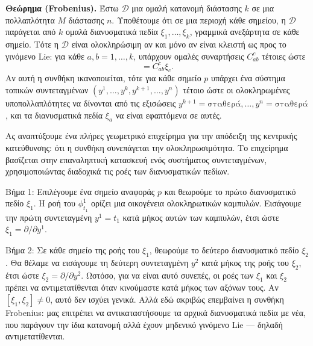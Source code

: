 \documentclass[12pt]{article}
\begin{document}
\textbf{Θεώρημα (Frobenius).} Έστω $\mathcal{D}$ μια ομαλή κατανομή διάστασης $k$ σε μια πολλαπλότητα $M$ διάστασης $n$. Υποθέτουμε ότι σε μια περιοχή κάθε σημείου, η $\mathcal{D}$ παράγεται από $k$ ομαλά διανυσματικά πεδία $\xi_1, \dots, \xi_k$, γραμμικά ανεξάρτητα σε κάθε σημείο. Τότε η $\mathcal{D}$ είναι ολοκληρώσιμη αν και μόνο αν είναι κλειστή ως προς το γινόμενο Lie: για κάθε $a, b = 1, \dots, k$, υπάρχουν ομαλές συναρτήσεις $C_{ab}^c$ τέτοιες ώστε
\begin{equation}
[\xi_a, \xi_b] = C_{ab}^c \xi_c.
\end{equation}
Αν αυτή η συνθήκη ικανοποιείται, τότε για κάθε σημείο $p$ υπάρχει ένα σύστημα τοπικών συντεταγμένων $(y^1, \dots, y^k, y^{k+1}, \dots, y^n)$ τέτοιο ώστε οι ολοκληρωμένες υποπολλαπλότητες να δίνονται από τις εξισώσεις $y^{k+1} = \text{σταθερά}, \dots, y^n = \text{σταθερά}$, και τα διανυσματικά πεδία $\xi_a$ να είναι εφαπτόμενα σε αυτές.

Ας αναπτύξουμε ένα πλήρες γεωμετρικό επιχείρημα για την απόδειξη της κεντρικής κατεύθυνσης: ότι η συνθήκη συνεπάγεται την ολοκληρωσιμότητα. Το επιχείρημα βασίζεται στην επαναληπτική κατασκευή ενός συστήματος συντεταγμένων, χρησιμοποιώντας διαδοχικά τις ροές των διανυσματικών πεδίων.

Βήμα 1: Επιλέγουμε ένα σημείο αναφοράς $p$ και θεωρούμε το πρώτο διανυσματικό πεδίο $\xi_1$. Η ροή του $\phi^1_{t_1}$ ορίζει μια οικογένεια ολοκληρωτικών καμπυλών. Εισάγουμε την πρώτη συντεταγμένη $y^1 = t_1$ κατά μήκος αυτών των καμπυλών, έτσι ώστε $\xi_1 = \partial / \partial y^1$.

Βήμα 2: Σε κάθε σημείο της ροής του $\xi_1$, θεωρούμε το δεύτερο διανυσματικό πεδίο $\xi_2$. Θα θέλαμε να εισάγουμε τη δεύτερη συντεταγμένη $y^2$ κατά μήκος της ροής του $\xi_2$, έτσι ώστε $\xi_2 = \partial / \partial y^2$. Ωστόσο, για να είναι αυτό συνεπές, οι ροές των $\xi_1$ και $\xi_2$ πρέπει να αντιμετατίθενται όταν κινούμαστε κατά μήκος των αξόνων τους. Αν $[\xi_1, \xi_2] \neq 0$, αυτό δεν ισχύει γενικά. Αλλά εδώ ακριβώς επεμβαίνει η συνθήκη Frobenius: μας επιτρέπει να αντικαταστήσουμε τα αρχικά διανυσματικά πεδία με νέα, που παράγουν την ίδια κατανομή αλλά έχουν μηδενικό γινόμενο Lie — δηλαδή αντιμετατίθενται.
\end{document}
